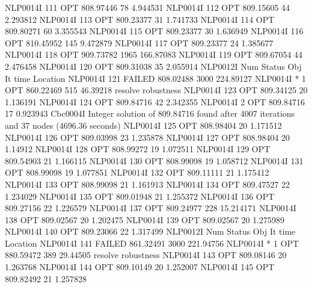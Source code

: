 NLP0014I           111         OPT 808.97446       78 4.944531
NLP0014I           112         OPT 809.15605       44 2.293812
NLP0014I           113         OPT 809.23377       31 1.741733
NLP0014I           114         OPT 809.80271       60 3.355543
NLP0014I           115         OPT 809.23377       30 1.636949
NLP0014I           116         OPT 810.45952      145 9.472879
NLP0014I           117         OPT 809.23377       24 1.385677
NLP0014I           118         OPT 909.73782     1965 166.87083
NLP0014I           119         OPT 809.67054       44 2.476458
NLP0014I           120         OPT 809.31038       35 2.055914
NLP0012I 
              Num      Status      Obj             It       time                 Location
NLP0014I           121      FAILED 808.02488     3000 224.89127
NLP0014I *           1         OPT 860.22469      515 46.39218   resolve robustness
NLP0014I           123         OPT 809.34125       20 1.136191
NLP0014I           124         OPT 809.84716       42 2.342355
NLP0014I             2         OPT 809.84716       17 0.923943
Cbc0004I Integer solution of 809.84716 found after 4007 iterations and 37 nodes (4696.36 seconds)
NLP0014I           125         OPT 808.98404       20 1.171512
NLP0014I           126         OPT 809.03998       23 1.235878
NLP0014I           127         OPT 808.98404       20 1.14912
NLP0014I           128         OPT 808.99272       19 1.072511
NLP0014I           129         OPT 809.54903       21 1.166115
NLP0014I           130         OPT 808.99098       19 1.058712
NLP0014I           131         OPT 808.99098       19 1.077851
NLP0014I           132         OPT 809.11111       21 1.175412
NLP0014I           133         OPT 808.99098       21 1.161913
NLP0014I           134         OPT 809.47527       22 1.234029
NLP0014I           135         OPT 809.01948       21 1.255372
NLP0014I           136         OPT 809.27156       22 1.226579
NLP0014I           137         OPT 809.24977      228 15.214171
NLP0014I           138         OPT 809.02567       20 1.202475
NLP0014I           139         OPT 809.02567       20 1.275989
NLP0014I           140         OPT 809.23066       22 1.317499
NLP0012I 
              Num      Status      Obj             It       time                 Location
NLP0014I           141      FAILED 861.32491     3000 221.94756
NLP0014I *           1         OPT 880.59472      389 29.44505   resolve robustness
NLP0014I           143         OPT 809.08146       20 1.263768
NLP0014I           144         OPT 809.10149       20 1.252007
NLP0014I           145         OPT 809.82492       21 1.257828
